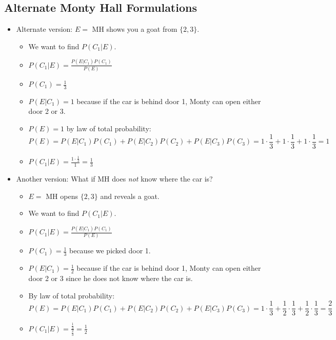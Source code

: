 \subsection{Alternate Monty Hall Formulations}

\begin{itemize}
    \item Alternate version: $E =$ MH shows you a goat from $\{ 2, 3 \}$.
          \begin{itemize}
              \item We want to find $P(C_1 | E)$.
              \item $P(C_1 | E) = \frac{P(E | C_1) P(C_1)}{P(E)}$
              \item $P(C_1) = \frac{1}{3}$
              \item $P(E | C_1) = 1$ because if the car is behind door 1, Monty can open either door 2 or 3.
              \item $P(E) = 1$ by law of total probability:
                    \[ P(E) = P(E | C_1) P(C_1) + P(E | C_2) P(C_2) + P(E | C_3) P(C_3) = 1 \cdot \frac{1}{3} + 1 \cdot \frac{1}{3} + 1 \cdot \frac{1}{3} = 1 \]
              \item $P(C_1 | E) = \frac{1 \cdot \frac{1}{3}}{1} = \frac{1}{3}$
          \end{itemize}

    \item Another version: What if MH does \textit{not} know where the car is?
          \begin{itemize}
              \item $E =$ MH opens $\{2,3\}$ and reveals a goat.
              \item We want to find $P(C_1 | E)$.
              \item $P(C_1 | E) = \frac{P(E | C_1) P(C_1)}{P(E)}$
              \item $P(C_1) = \frac{1}{3}$ because we picked door 1.
              \item $P(E | C_1) = \frac{1}{2}$ because if the car is behind door 1, Monty can open either door 2 or 3 since he does not know where the car is.
              \item By law of total probability:
                    \[ P(E) = P(E | C_1) P(C_1) + P(E | C_2) P(C_2) + P(E | C_3) P(C_3) = 1 \cdot \frac{1}{3} + \frac{1}{2} \cdot \frac{1}{3} + \frac{1}{2}\cdot \frac{1}{3} = \frac{2}{3} \]
              \item $P(C_1 | E) = \frac{\frac{1}{3}}{\frac{2}{3}} = \frac{1}{2}$
          \end{itemize}
\end{itemize}

